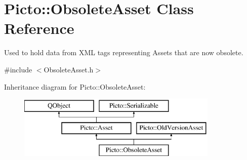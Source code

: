 \hypertarget{class_picto_1_1_obsolete_asset}{\section{Picto\-:\-:Obsolete\-Asset Class Reference}
\label{class_picto_1_1_obsolete_asset}
}


Used to hold data from X\-M\-L tags representing Assets that are now obsolete.  




{\ttfamily \#include $<$Obsolete\-Asset.\-h$>$}

Inheritance diagram for Picto\-:\-:Obsolete\-Asset\-:\begin{figure}[H]
\begin{center}
\leavevmode
\includegraphics[height=3.000000cm]{class_picto_1_1_obsolete_asset}
\end{center}
\end{figure}
